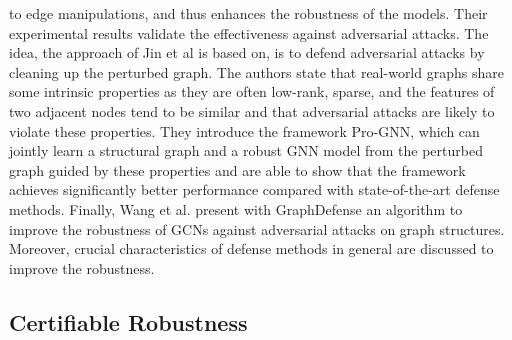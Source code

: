 \documentclass[a4paper,preprint]{sig-alternate}
\begin{document}
to edge manipulations, and thus enhances the robustness of the models. Their experimental results validate the effectiveness 
against adversarial attacks.
The idea, the approach of Jin et al \cite{Jin_2020_Graph} is based on, is to defend adversarial attacks by cleaning up the perturbed graph.
The authors state that real-world graphs share some intrinsic properties as they are often low-rank, sparse, and the features of two adjacent
nodes tend to be similar and that adversarial attacks are likely to violate these properties.
They introduce the framework Pro-GNN, which can jointly learn a structural graph and a robust GNN model from the perturbed graph guided by
these properties and are able to show that the framework achieves significantly better performance compared with state-of-the-art 
defense methods.
Finally, Wang et al. \cite{Wang_2019} present with GraphDefense an algorithm to improve the robustness of GCNs
against adversarial attacks on graph structures. Moreover, crucial characteristics of defense methods in general are discussed to improve 
the robustness.

\subsection{Certifiable Robustness}
\label{sec:rev3}
\end{document}
